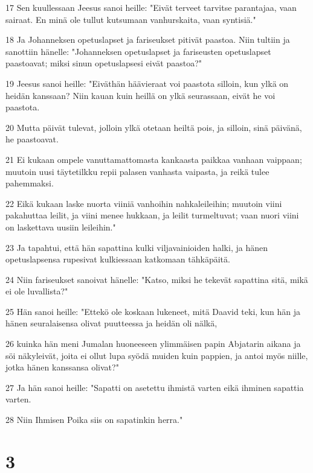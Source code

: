 \par 17 Sen kuullessaan Jeesus sanoi heille: "Eivät terveet tarvitse parantajaa, vaan sairaat. En minä ole tullut kutsumaan vanhurskaita, vaan syntisiä."
\par 18 Ja Johanneksen opetuslapset ja fariseukset pitivät paastoa. Niin tultiin ja sanottiin hänelle: "Johanneksen opetuslapset ja fariseusten opetuslapset paastoavat; miksi sinun opetuslapsesi eivät paastoa?"
\par 19 Jeesus sanoi heille: "Eiväthän häävieraat voi paastota silloin, kun ylkä on heidän kanssaan? Niin kauan kuin heillä on ylkä seurassaan, eivät he voi paastota.
\par 20 Mutta päivät tulevat, jolloin ylkä otetaan heiltä pois, ja silloin, sinä päivänä, he paastoavat.
\par 21 Ei kukaan ompele vanuttamattomasta kankaasta paikkaa vanhaan vaippaan; muutoin uusi täytetilkku repii palasen vanhasta vaipasta, ja reikä tulee pahemmaksi.
\par 22 Eikä kukaan laske nuorta viiniä vanhoihin nahkaleileihin; muutoin viini pakahuttaa leilit, ja viini menee hukkaan, ja leilit turmeltuvat; vaan nuori viini on laskettava uusiin leileihin."
\par 23 Ja tapahtui, että hän sapattina kulki viljavainioiden halki, ja hänen opetuslapsensa rupesivat kulkiessaan katkomaan tähkäpäitä.
\par 24 Niin fariseukset sanoivat hänelle: "Katso, miksi he tekevät sapattina sitä, mikä ei ole luvallista?"
\par 25 Hän sanoi heille: "Ettekö ole koskaan lukeneet, mitä Daavid teki, kun hän ja hänen seuralaisensa olivat puutteessa ja heidän oli nälkä,
\par 26 kuinka hän meni Jumalan huoneeseen ylimmäisen papin Abjatarin aikana ja söi näkyleivät, joita ei ollut lupa syödä muiden kuin pappien, ja antoi myös niille, jotka hänen kanssansa olivat?"
\par 27 Ja hän sanoi heille: "Sapatti on asetettu ihmistä varten eikä ihminen sapattia varten.
\par 28 Niin Ihmisen Poika siis on sapatinkin herra."

\chapter{3}

